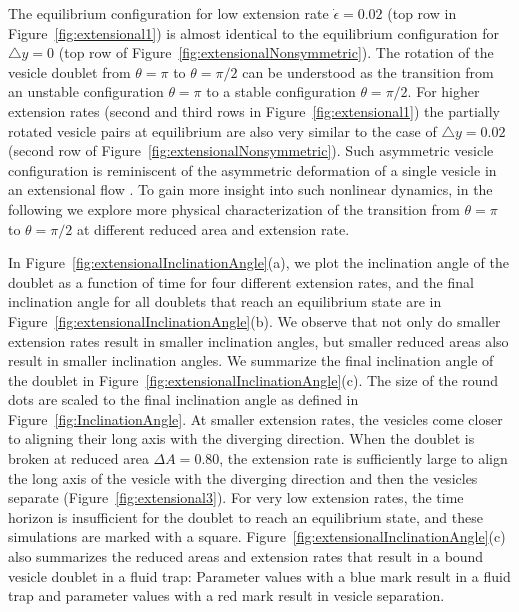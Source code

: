 \documentclass[prf,superscriptaddress,showkeys,longbibliography]{revtex4-1}
\begin{document}
%
The equilibrium configuration for low extension rate $\dot\epsilon=0.02$ (top row in Figure~\ref{fig:extensional1}) is
almost identical to the equilibrium configuration for $\triangle y=0$ (top row of  Figure~\ref{fig:extensionalNonsymmetric}).
The rotation of the vesicle doublet 
from $\theta=\pi$ to $\theta=\pi/2$ can be understood as the transition from an unstable configuration $\theta=\pi$ to a stable configuration $\theta=\pi/2$.
For higher extension rates (second and third rows in Figure~\ref{fig:extensional1}) the partially rotated vesicle pairs at equilibrium are
also very similar to the case of $\triangle y=0.02$ (second row of Figure~\ref{fig:extensionalNonsymmetric}).
Such asymmetric vesicle configuration is reminiscent of the asymmetric deformation of a single vesicle in an extensional flow \cite{KantslerSegreSteinberg2008_PRL,Narsimhan2014_JFM,DahlNarsimhanGouveia2016_SoftMatt}.
To gain more insight into such nonlinear dynamics, in the following we explore more physical characterization of the transition from $\theta=\pi$ to $\theta=\pi/2$ at
different reduced area and extension rate.
%

In Figure~\ref{fig:extensionalInclinationAngle}(a), we plot the
inclination angle of the doublet as a function of time for four
different extension rates,  and the final inclination angle for all
doublets that reach an equilibrium state are in
Figure~\ref{fig:extensionalInclinationAngle}(b).  We observe that not
only do smaller extension rates result in smaller inclination angles,
but smaller reduced areas also result in smaller inclination angles.  We
summarize the final inclination angle of the doublet in
Figure~\ref{fig:extensionalInclinationAngle}(c).  The size of the round
dots are scaled to the final inclination angle as defined in
Figure~\ref{fig:InclinationAngle}.  At smaller extension rates, the
vesicles come closer to aligning their long axis with the diverging
direction.  When the doublet is broken at reduced area $\Delta A =
0.80$, the extension rate is sufficiently large to align the long axis
of the vesicle with the diverging direction and then the vesicles
separate (Figure~\ref{fig:extensional3}).  For very low extension
rates, the time horizon is insufficient for the doublet to reach an
equilibrium state, and these simulations are marked with a square.
Figure~\ref{fig:extensionalInclinationAngle}(c) also summarizes the
reduced areas and extension rates that result in a bound vesicle
doublet in a fluid trap: Parameter values with a blue mark result in a
fluid trap and parameter values with a red mark result in vesicle
separation.
\end{document}
